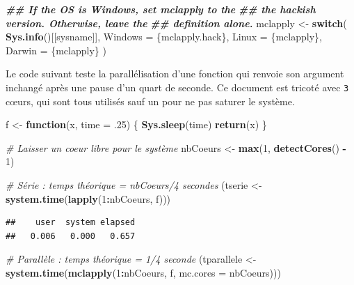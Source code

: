 \documentclass[
  12pt,
  french,
  a4paper,
  extrafontsizes,onecolumn,openright
  ]{memoir}
\newenvironment{Shaded}{\begin{snugshade}}{\end{snugshade}}
\newcommand{\AttributeTok}[1]{\textcolor[rgb]{0.13,0.29,0.53}{#1}}
\newcommand{\CommentTok}[1]{\textcolor[rgb]{0.56,0.35,0.01}{\textit{#1}}}
\newcommand{\ControlFlowTok}[1]{\textcolor[rgb]{0.13,0.29,0.53}{\textbf{#1}}}
\newcommand{\DecValTok}[1]{\textcolor[rgb]{0.00,0.00,0.81}{#1}}
\newcommand{\DocumentationTok}[1]{\textcolor[rgb]{0.56,0.35,0.01}{\textbf{\textit{#1}}}}
\newcommand{\FunctionTok}[1]{\textcolor[rgb]{0.13,0.29,0.53}{\textbf{#1}}}
\newcommand{\NormalTok}[1]{#1}
\newcommand{\OtherTok}[1]{\textcolor[rgb]{0.56,0.35,0.01}{#1}}
\newcommand{\SpecialCharTok}[1]{\textcolor[rgb]{0.81,0.36,0.00}{\textbf{#1}}}
\newcommand{\StringTok}[1]{\textcolor[rgb]{0.31,0.60,0.02}{#1}}
\begin{document}
\begin{Shaded}
\begin{Highlighting}[]
\DocumentationTok{\#\# If the OS is Windows, set mclapply to the}
\DocumentationTok{\#\# the hackish version. Otherwise, leave the}
\DocumentationTok{\#\# definition alone. }
\NormalTok{mclapply }\OtherTok{\textless{}{-}} \ControlFlowTok{switch}\NormalTok{(}
  \FunctionTok{Sys.info}\NormalTok{()[[}\StringTok{\textquotesingle{}sysname\textquotesingle{}}\NormalTok{]],}
  \AttributeTok{Windows =}\NormalTok{ \{mclapply.hack\}, }
  \AttributeTok{Linux   =}\NormalTok{ \{mclapply\},}
  \AttributeTok{Darwin  =}\NormalTok{ \{mclapply\}}
\NormalTok{)}
\end{Highlighting}
\end{Shaded}

\normalsize

Le code suivant teste la parallélisation d'une fonction qui renvoie son argument inchangé après une pause d'un quart de seconde.
Ce document est tricoté avec \texttt{3} cœurs, qui sont tous utilisés sauf un pour ne pas saturer le système.

\scriptsize

\begin{Shaded}
\begin{Highlighting}[]
\NormalTok{f }\OtherTok{\textless{}{-}} \ControlFlowTok{function}\NormalTok{(x, }\AttributeTok{time =}\NormalTok{ .}\DecValTok{25}\NormalTok{) \{}
  \FunctionTok{Sys.sleep}\NormalTok{(time)}
  \FunctionTok{return}\NormalTok{(x)}
\NormalTok{\}}

\CommentTok{\# Laisser un coeur libre pour le système}
\NormalTok{nbCoeurs }\OtherTok{\textless{}{-}} \FunctionTok{max}\NormalTok{(}\DecValTok{1}\NormalTok{, }\FunctionTok{detectCores}\NormalTok{() }\SpecialCharTok{{-}} \DecValTok{1}\NormalTok{)}

\CommentTok{\# Série : temps théorique = nbCoeurs/4 secondes}
\NormalTok{(tserie }\OtherTok{\textless{}{-}} \FunctionTok{system.time}\NormalTok{(}\FunctionTok{lapply}\NormalTok{(}\DecValTok{1}\SpecialCharTok{:}\NormalTok{nbCoeurs, f)))}
\end{Highlighting}
\end{Shaded}

\begin{verbatim}
##    user  system elapsed 
##   0.006   0.000   0.657
\end{verbatim}

\begin{Shaded}
\begin{Highlighting}[]
\CommentTok{\# Parallèle : temps théorique = 1/4 seconde}
\NormalTok{(tparallele }\OtherTok{\textless{}{-}} \FunctionTok{system.time}\NormalTok{(}\FunctionTok{mclapply}\NormalTok{(}\DecValTok{1}\SpecialCharTok{:}\NormalTok{nbCoeurs, f, }\AttributeTok{mc.cores =}\NormalTok{ nbCoeurs)))}
\end{Highlighting}
\end{Shaded}
\end{document}
